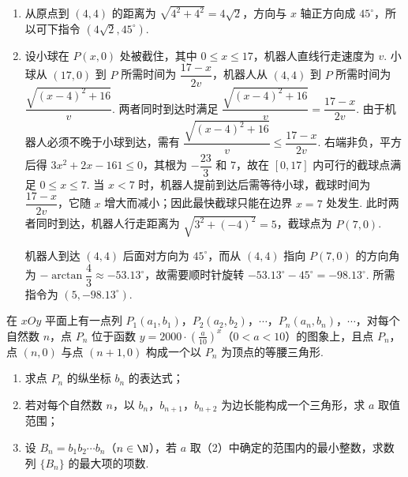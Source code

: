 \begin{solution}
\begin{enumerate}
\item 从原点到 \((4,4)\) 的距离为 \(\sqrt{4^2+4^2}=4\sqrt{2}\)，方向与 \(x\) 轴正方向成 \(45^\circ\)，所以可下指令 \(\left(4\sqrt{2},45^\circ\right)\).
\item 设小球在 \(P(x,0)\) 处被截住，其中 \(0\leqslant x\leqslant17\)，机器人直线行走速度为 \(v\). 小球从 \((17,0)\) 到 \(P\) 所需时间为 \(\dfrac{17-x}{2v}\)，机器人从 \((4,4)\) 到 \(P\) 所需时间为 \(\dfrac{\sqrt{(x-4)^2+16}}{v}\). 两者同时到达时满足
\(\dfrac{\sqrt{(x-4)^2+16}}{v}=\dfrac{17-x}{2v}\).
由于机器人必须不晚于小球到达，需有 \(\dfrac{\sqrt{(x-4)^2+16}}{v}\leqslant\dfrac{17-x}{2v}\). 右端非负，平方后得 \(3x^2+2x-161\leqslant0\)，其根为 \(-\dfrac{23}{3}\) 和 \(7\)，故在 \([0,17]\) 内可行的截球点满足 \(0\leqslant x\leqslant7\). 当 \(x<7\) 时，机器人提前到达后需等待小球，截球时间为 \(\dfrac{17-x}{2v}\)，它随 \(x\) 增大而减小；因此最快截球只能在边界 \(x=7\) 处发生. 此时两者同时到达，机器人行走距离为 \(\sqrt{3^2+(-4)^2}=5\)，截球点为 \(P(7,0)\).

机器人到达 \((4,4)\) 后面对方向为 \(45^\circ\)，而从 \((4,4)\) 指向 \(P(7,0)\) 的方向角为 \(-\arctan\dfrac{4}{3}\approx-53.13^\circ\)，故需要顺时针旋转 \(-53.13^\circ-45^\circ=-98.13^\circ\). 所需指令为 \(\left(5,-98.13^\circ\right)\).
\end{enumerate}
\end{solution}

\begin{problem}
在 \(xOy\) 平面上有一点列 \(P_{1}(a_{1},b_{1})\)，\(P_{2}(a_{2},b_{2})\)，\(\cdots\)，\(P_{n}(a_{n},b_{n})\)，\(\cdots\)，对每个自然数 \(n\)，点 \(P_{n}\) 位于函数 \(y = 2000 \cdot \left(\frac{a}{10}\right)^{x}\)（\(0 < a < 10\)）的图象上，且点 \(P_{n}\)，点 \((n,0)\) 与点 \((n + 1,0)\) 构成一个以 \(P_{n}\) 为顶点的等腰三角形.
\begin{enumerate}
\item 求点 \(P_{n}\) 的纵坐标 \(b_{n}\) 的表达式；
\item 若对每个自然数 \(n\)，以 \(b_{n}\)，\(b_{n+1}\)，\(b_{n+2}\) 为边长能构成一个三角形，求 \(a\) 取值范围；
\item 设 \(B_{n} = b_{1}b_{2}\cdots b_{n}\)（\(n \in \N\)），若 \(a\) 取（2）中确定的范围内的最小整数，求数列 \(\{B_{n}\}\) 的最大项的项数.
\end{enumerate}
\end{problem}

